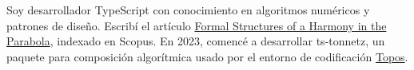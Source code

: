 \documentclass[letterpaper,10pt,oneside]{article}
\begin{document}




\vspace{2em}

\noindent Soy desarrollador TypeScript con conocimiento en algoritmos numéricos y patrones de diseño. Escribí el artículo \href{https://link.springer.com/chapter/10.1007/978-3-031-07015-0_30}{Formal Structures of a Harmony in the Parabola}, indexado en Scopus. En 2023, comencé a desarrollar ts-tonnetz, un paquete para composición algorítmica usado por el entorno de codificación \href{https://topos.live/#ziffers_tonnetz}{Topos}.
\end{document}
